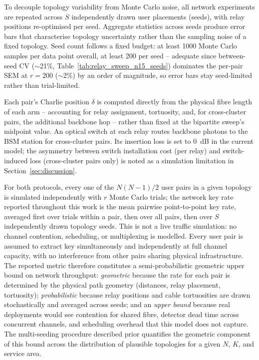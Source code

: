 \documentclass[12pt]{article}
\begin{document}
To decouple topology variability from Monte Carlo noise, all network experiments are repeated across $S$ independently drawn user placements (seeds), with relay positions re-optimised per seed. Aggregate statistics across seeds produce error bars that characterise topology uncertainty rather than the sampling noise of a fixed topology. Seed count follows a fixed budget: at least 1000 Monte Carlo samples per data point overall, at least 200 per seed -- adequate since between-seed CV ($\sim$21\%, Table~\ref{tab:relay_sweep_n15_seeds}) dominates the per-pair SEM at $r=200$ ($\sim$2\%) by an order of magnitude, so error bars stay seed-limited rather than trial-limited.

Each pair's Charlie position $\delta$ is computed directly from the physical fibre length of each arm -- accounting for relay assignment, tortuosity, and, for cross-cluster pairs, the additional backbone hop -- rather than fixed at the bipartite sweep's midpoint value. An optical switch at each relay routes backbone photons to the BSM station for cross-cluster pairs. Its insertion loss is set to 0~dB in the current model; the asymmetry between switch installation cost (per relay) and switch-induced loss (cross-cluster pairs only) is noted as a simulation limitation in Section~\ref{sec:discussion}.

For both protocols, every one of the $N(N-1)/2$ user pairs in a given topology is simulated independently with $r$ Monte Carlo trials; the network key rate reported throughout this work is the mean pairwise point-to-point key rate, averaged first over trials within a pair, then over all pairs, then over $S$ independently drawn topology seeds. This is not a live traffic simulation: no channel contention, scheduling, or multiplexing is modelled. Every user pair is assumed to extract key simultaneously and independently at full channel capacity, with no interference from other pairs sharing physical infrastructure. The reported metric therefore constitutes a semi-probabilistic geometric upper bound on network throughput: \textit{geometric} because the rate for each pair is determined by the physical path geometry (distances, relay placement, tortuosity); \textit{probabilistic} because relay positions and cable tortuosities are drawn stochastically and averaged across seeds; and an \textit{upper bound} because real deployments would see contention for shared fibre, detector dead time across concurrent channels, and scheduling overhead that this model does not capture. The multi-seeding procedure described prior quantifies the geometric component of this bound across the distribution of plausible topologies for a given $N$, $K$, and service area.
\end{document}
